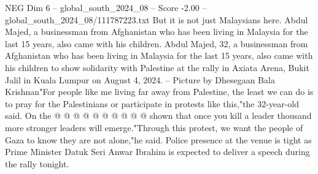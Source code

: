 \begin{textsample}{NEG Dim 6 – global\_south\_2024\_08 – Score -2.00 – global\_south\_2024\_08/111787223.txt}
But it is not just Malaysians here.
Abdul Majed, a businessman from Afghanistan who has been living in Malaysia for the last 15 years, also came with his children.
Abdul Majed, 32, a businessman from Afghanistan who has been living in Malaysia for the last 15 years, also came with his children to show solidarity with Palestine at the rally in Axiata Arena, Bukit Jalil in Kuala Lumpur on August 4, 2024. -- Picture by Dhesegaan Bala Krishnan"For people like me living far away from Palestine, the least we can do is to pray for the Palestinians or participate in protests like this,"the 32-year-old said.
On the @ @ @ @ @ @ @ @ @ @ shown that once you kill a leader thousand more stronger leaders will emerge."Through this protest, we want the people of Gaza to know they are not alone,"he said.
Police presence at the venue is tight as Prime Minister Datuk Seri Anwar Ibrahim is expected to deliver a speech during the rally tonight.

\end{textsample}
